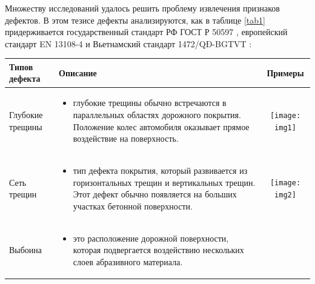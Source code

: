 \documentclass[a4paper,14pt]{extreport}
\begin{document}
Множеству исследований удалось решить проблему извлечения признаков дефектов. В этом тезисе дефекты анализируются, как в таблице \ref{tab1} придерживается государственный стандарт РФ ГОСТ Р 50597 \cite{h146}, европейский стандарт EN 13108-4 \cite{h148} и Вьетнамский стандарт 1472/QĐ-BGTVT \cite{h147}:
\begin{table}[h!]
  \centering
  \begin{tabular}{ | m{2cm} | m{9cm} | c |  }
    \hline
    Типов дефекта & Описание & Примеры \\ \hline
   Глубокие трещины
    & 
      \begin{itemize}
        \item 	глубокие трещины обычно встречаются в параллельных областях дорожного покрытия. Положение колес автомобиля оказывает прямое воздействие на поверхность. 
 
      \end{itemize}
			&
			 \begin{minipage}{.3\textwidth}
			\centering
      \texttt{[image: img1]}
    \end{minipage}
    \\ \hline
  Сеть трещин
    & 
      \begin{itemize}
        \item 	тип дефекта покрытия, который развивается из горизонтальных трещин и вертикальных трещин. Этот дефект обычно появляется на больших участках бетонной поверхности.
      \end{itemize}
			&
			 \begin{minipage}{.3\textwidth}
			\centering
      \texttt{[image: img2]}
    \end{minipage}
    \\ \hline
	  Выбоина
    & 
      \begin{itemize}
        \item 	это расположение дорожной поверхности, которая подвергается воздействию нескольких слоев абразивного материала.


\end{itemize}
\end{tabular}
\end{table}
\end{document}
